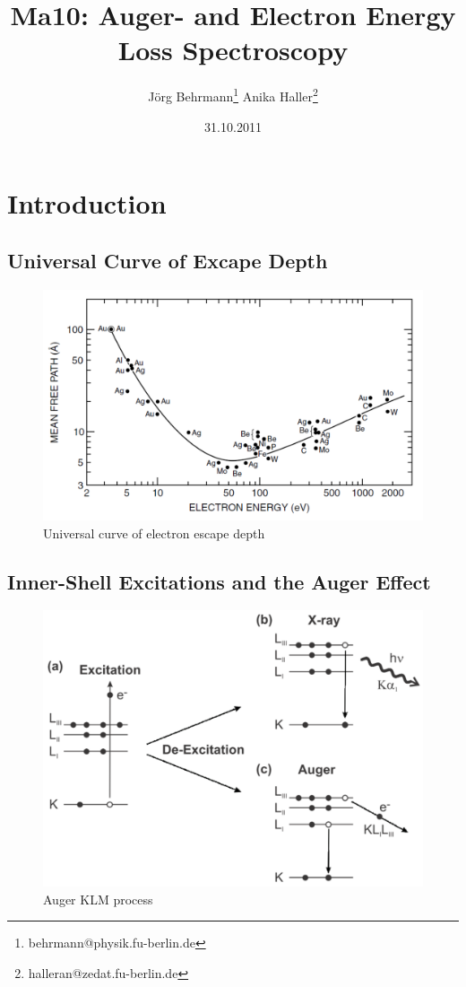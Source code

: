 \documentclass[a4paper,10pt]{scrartcl}
\begin{document}
\title{Ma10: Auger- and Electron Energy Loss Spectroscopy}
\author{J\"org Behrmann\footnote{behrmann@physik.fu-berlin.de} \qquad Anika Haller\footnote{halleran@zedat.fu-berlin.de}}
\date{31.10.2011}
\maketitle
\tableofcontents
\thispagestyle{empty}


\section{Introduction}

\subsection{Universal Curve of Excape Depth}

\begin{figure}
\centering
\includegraphics[scale=0.4]{img/ucurve}
\caption{Universal curve of electron escape depth \label{fig:ucurve}}
\end{figure}

\subsection{Inner-Shell Excitations and the Auger Effect}

\begin{figure}
\centering
\includegraphics[scale=0.4]{img/auger}
\caption{Auger KLM process \label{fig:aauger}}
\end{figure}
\end{document}
